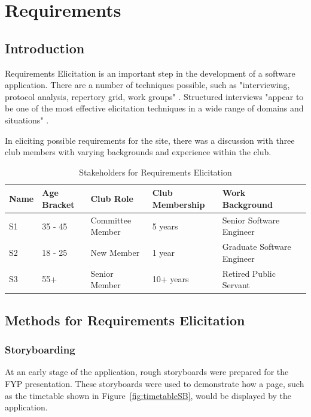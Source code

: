 \chapter{Requirements}
\label{requirements}

\section{Introduction}

Requirements Elicitation is an important step in the development of a software application. There are a number of techniques possible, such as "interviewing, protocol analysis, repertory grid, work groups" \parencite{davis2006effectiveness}. Structured interviews "appear to be one of the most effective elicitation techniques in a wide range of domains and situations" \parencite{davis2006effectiveness}. 

In eliciting possible requirements for the site, there was a discussion with three club members with varying backgrounds and experience within the club.

\begin{table}[H]
\caption{Stakeholders for Requirements Elicitation}
\begin{center}
    \begin{tabular}{ | l | l | l | l | l| p{5cm} |}
    \hline
    Name & Age Bracket & Club Role & Club Membership & Work Background \\ \hline
	S1 & 35 - 45& Committee Member & 5 years & Senior Software Engineer \\ \hline
	S2 & 18 - 25 & New Member & 1 year & Graduate Software Engineer \\ \hline
	S3 & 55+ & Senior Member & 10+ years & Retired Public Servant \\ \hline
    \end{tabular}
\end{center}
\label{fig:userelicit}
\end{table}

\section{Methods for Requirements Elicitation}

\subsection{Storyboarding}

At an early stage of the application, rough storyboards were prepared for the FYP presentation. These storyboards were used to demonstrate how a page, such as the timetable shown in Figure~\ref{fig:timetableSB}, would be displayed by the application.

